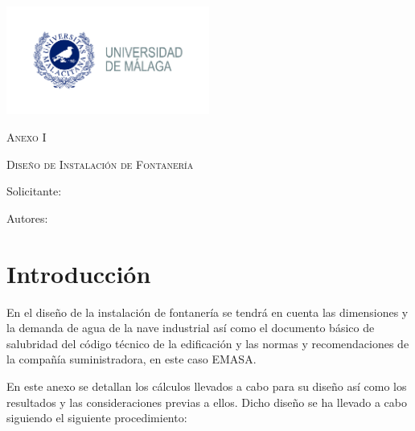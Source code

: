 \documentclass[../main.tex]{subfiles}
\begin{document}
\newpage
\thispagestyle{empty}
\begin{center}
    {\includegraphics[width=0.5\textwidth]{Imagenes/Logo UMA.jpg}\par}
    \vspace{1cm}
    {\bfseries\LARGE \Facultad \par}
    \vspace{0.5cm}
    {\scshape\Large \Grado \par}
    \vspace{1.5cm}
    {\scshape\Huge Anexo I \par}
    \vspace{0.5cm}
    {\scshape\Huge Diseño de Instalación de Fontanería \par}
    \vspace{1.5cm}
    {\itshape\Large \TituloProyecto \par}
    \vfill
    {\Large Solicitante: \par}
    {\Large \Solicitante  \par}
    \vspace{1cm}
    {\Large Autores: \par}
    {\Large \Autora \par}
    {\Large \Autor \par}
    \vfill
    {\Large \Fecha \par}
\end{center}

\newpage
\section{Introducción}
En el diseño de la instalación de fontanería se tendrá en cuenta las dimensiones y la demanda de agua de la nave industrial así como el documento básico de salubridad del código técnico de la edificación y las normas y recomendaciones de la compañía suministradora, en este caso EMASA. \par
\vspace{0.5 cm}
En este anexo se detallan los cálculos llevados a cabo para su diseño así como los resultados y las consideraciones previas a ellos. Dicho diseño se ha llevado a cabo siguiendo el siguiente procedimiento:
\end{document}
